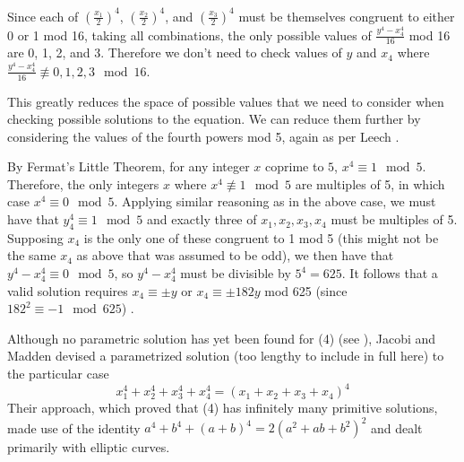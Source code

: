 \documentclass{article}
\begin{document}
\begin{flushleft}
Since each of $(\frac{x_1}{2})^4$, $(\frac{x_2}{2})^4$, and $(\frac{x_3}{2})^4$ must be themselves congruent to either 0 or 1 mod 16, taking all combinations, the only possible values of $ \frac{y^4-x_4^4}{16}$ mod 16 are 0, 1, 2, and 3. Therefore we don't need to check values of $y$ and $x_4$ where $ \frac{y^4-x_4^4}{16} \not\equiv 0, 1, 2, 3 \mod 16$. \vspace{.1in}

This greatly reduces the space of possible values that we need to consider when checking possible solutions to the equation. We can reduce them further by considering the values of the fourth powers mod 5, again as per Leech \cite{leech}.  \vspace{.1in}

By Fermat's Little Theorem, for any integer $x$ coprime to $5$, $x^4 \equiv 1 \mod 5$. Therefore, the only integers $x$ where $x^4 \not\equiv 1 \mod 5$ are multiples of 5, in which case $x^4 \equiv 0 \mod 5$. Applying similar reasoning as in the above case, we must have that $y_4^4 \equiv 1 \mod 5$ and exactly three of $x_1, x_2, x_3, x_4$ must be multiples of 5. Supposing $x_4$ is the only one of these congruent to 1 mod 5 (this might not be the same $x_4$ as above that was assumed to be odd), we then have that $y^4-x_4^4 \equiv 0 \mod 5 $, so $y^4-x_4^4$ must be divisible by $5^4=625$. It follows that a valid solution requires $ x_4 \equiv \pm y$ or $x_4 \equiv \pm 182 y $ mod 625 (since $182^2\equiv -1 \mod 625$) \cite{leech}. \vspace{.1in}

Although no parametric solution has yet been found for (4) (see \cite{diopheqfourth}), Jacobi and Madden \cite{jacobimadden} devised a parametrized solution (too lengthy to include in full here) to the particular case
\begin{equation*}
    x_1^4 + x_2^4 + x_3^4 + x_4^4 = (x_1+x_2+x_3+x_4)^4
\end{equation*}
Their approach, which proved that (4) has infinitely many primitive solutions, made use of the identity $a^4+b^4+(a+b)^4=2(a^2+ab+b^2)^2$ and dealt primarily with elliptic curves.


\end{flushleft}
\end{document}
